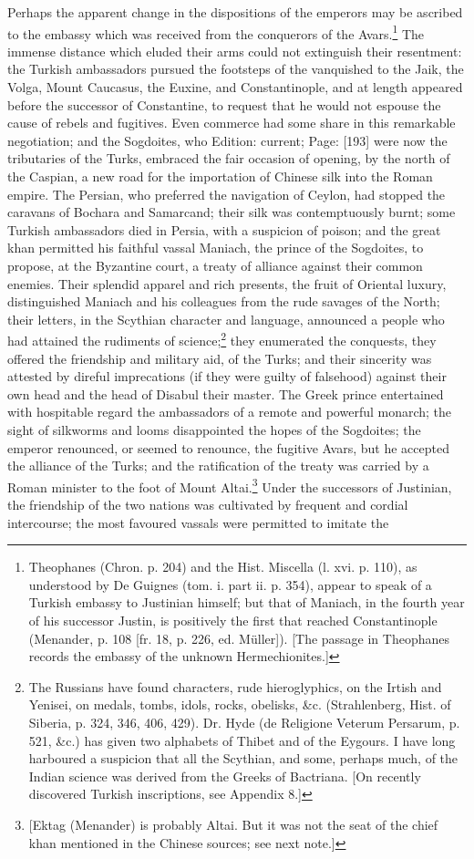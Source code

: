 Perhaps the apparent change in the dispositions of the emperors may be ascribed to the embassy which was received from the conquerors of the Avars.\footnote{Theophanes (Chron. p. 204) and the Hist. Miscella (l. xvi. p. 110), as understood by De Guignes (tom. i. part ii. p. 354), appear to speak of a Turkish embassy to Justinian himself; but that of Maniach, in the fourth year of his successor Justin, is positively the first that reached Constantinople (Menander, p. 108 [fr. 18, p. 226, ed. Müller]). [The passage in Theophanes records the embassy of the unknown Hermechionites.]} The immense distance which eluded their arms could not extinguish their resentment: the Turkish ambassadors pursued the footsteps of the vanquished to the Jaik, the Volga, Mount Caucasus, the Euxine, and Constantinople, and at length appeared before the successor of Constantine, to request that he would not espouse the cause of rebels and fugitives. Even commerce had some share in this remarkable negotiation; and the Sogdoites, who Edition: current; Page: [193] were now the tributaries of the Turks, embraced the fair occasion of opening, by the north of the Caspian, a new road for the importation of Chinese silk into the Roman empire. The Persian, who preferred the navigation of Ceylon, had stopped the caravans of Bochara and Samarcand; their silk was contemptuously burnt; some Turkish ambassadors died in Persia, with a suspicion of poison; and the great khan permitted his faithful vassal Maniach, the prince of the Sogdoites, to propose, at the Byzantine court, a treaty of alliance against their common enemies. Their splendid apparel and rich presents, the fruit of Oriental luxury, distinguished Maniach and his colleagues from the rude savages of the North; their letters, in the Scythian character and language, announced a people who had attained the rudiments of science;\footnote{The Russians have found characters, rude hieroglyphics, on the Irtish and Yenisei, on medals, tombs, idols, rocks, obelisks, \&c. (Strahlenberg, Hist. of Siberia, p. 324, 346, 406, 429). Dr. Hyde (de Religione Veterum Persarum, p. 521, \&c.) has given two alphabets of Thibet and of the Eygours. I have long harboured a suspicion that all the Scythian, and some, perhaps much, of the Indian science was derived from the Greeks of Bactriana. [On recently discovered Turkish inscriptions, see Appendix 8.]} they enumerated the conquests, they offered the friendship and military aid, of the Turks; and their sincerity was attested by direful imprecations (if they were guilty of falsehood) against their own head and the head of Disabul their master. The Greek prince entertained with hospitable regard the ambassadors of a remote and powerful monarch; the sight of silkworms and looms disappointed the hopes of the Sogdoites; the emperor renounced, or seemed to renounce, the fugitive Avars, but he accepted the alliance of the Turks; and the ratification of the treaty was carried by a Roman minister to the foot of Mount Altai.\footnote{[Ektag (Menander) is probably Altai. But it was not the seat of the chief khan mentioned in the Chinese sources; see next note.]} Under the successors of Justinian, the friendship of the two nations was cultivated by frequent and cordial intercourse; the most favoured vassals were permitted to imitate the 